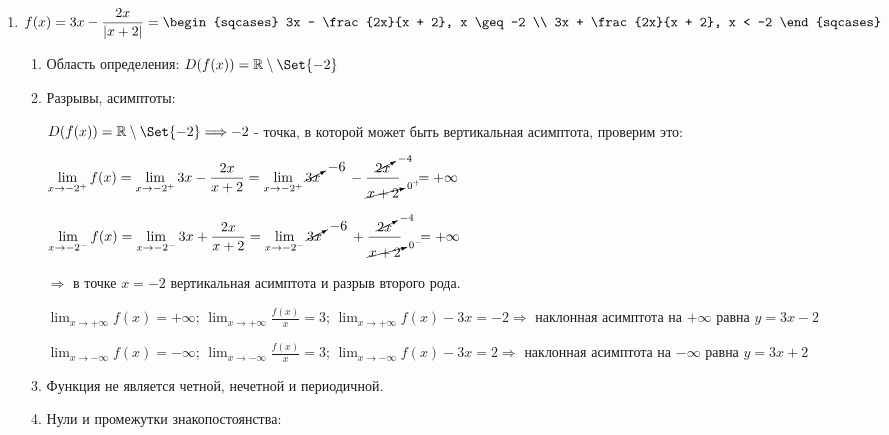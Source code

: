 \begin{enumerate}
    \item $\displaystyle f(x) = 3x - \frac{2x}{|x + 2|} =
    \begin{sqcases}
        3x - \frac{2x}{x + 2}, x \geq -2 \\
        3x + \frac{2x}{x + 2}, x < -2
    \end{sqcases}$

    \begin{enumerate}
        \item Область определения: $D(f(x)) = \Real \setminus \Set{-2}$
        \item Разрывы, асимптоты:

        $D(f(x)) = \Real \setminus \Set{-2} \Longrightarrow -2$ - точка, в которой может быть вертикальная асимптота, проверим это:

        $\displaystyle \lim_{x \to -2^+}{f(x)} = \lim_{x \to -2^+}{3x - \frac{2x}{x + 2}} = \lim_{x \to -2^+}{\cancelto{-6}{3x} \qquad - \frac{\cancelto{-4}{2x}}{\cancelto{0^+}{x + 2}}} \quad = +\infty$

        $\displaystyle \lim_{x \to -2^-}{f(x)} = \lim_{x \to -2^-}{3x + \frac{2x}{x + 2}} = \lim_{x \to -2^-}{\cancelto{-6}{3x} \qquad + \frac{\cancelto{-4}{2x}}{\cancelto{0^-}{x + 2}}} \quad = +\infty$

        \vspace{2mm}

        $\Longrightarrow$ в точке $x = -2$ вертикальная асимптота и разрыв второго рода.

        $\displaystyle \lim_{x \to +\infty}{f(x)} = +\infty$;
        $\displaystyle \lim_{x \to +\infty}{\frac{f(x)}{x}} = 3$;
        $\displaystyle \lim_{x \to +\infty}{f(x) - 3x} = -2 \Longrightarrow $ наклонная асимптота на $+\infty$ равна $y = 3x - 2$

        $\displaystyle \lim_{x \to -\infty}{f(x)} = -\infty$;
        $\displaystyle \lim_{x \to -\infty}{\frac{f(x)}{x}} = 3$;
        $\displaystyle \lim_{x \to -\infty}{f(x) - 3x} = 2 \Longrightarrow $ наклонная асимптота на $-\infty$ равна $y = 3x + 2$

        \item Функция не является четной, нечетной и периодичной.

        \item Нули и промежутки знакопостоянства:


\end{enumerate}
\end{enumerate}
